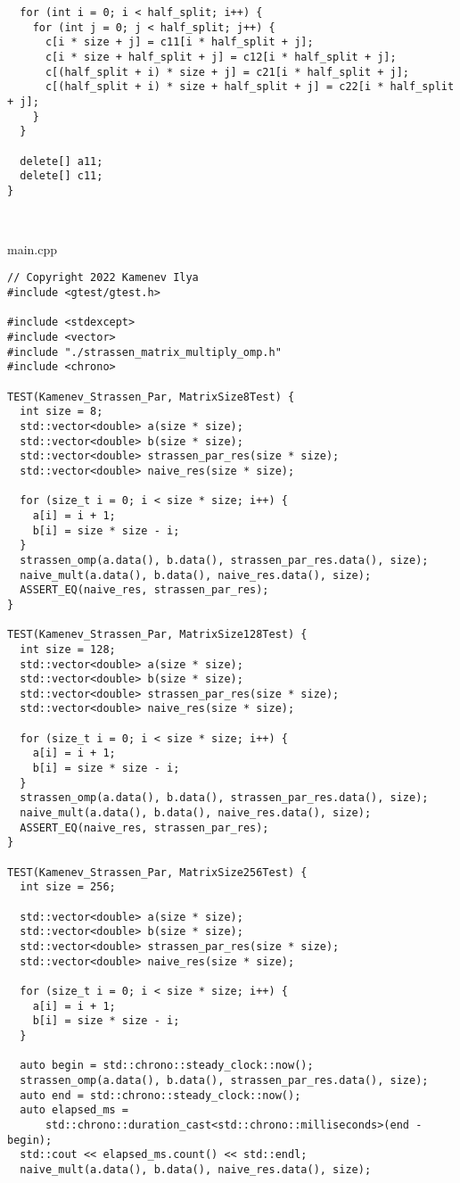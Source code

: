 \documentclass{report}
\begin{document}
\begin{lstlisting}
  for (int i = 0; i < half_split; i++) {
    for (int j = 0; j < half_split; j++) {
      c[i * size + j] = c11[i * half_split + j];
      c[i * size + half_split + j] = c12[i * half_split + j];
      c[(half_split + i) * size + j] = c21[i * half_split + j];
      c[(half_split + i) * size + half_split + j] = c22[i * half_split + j];
    }
  }

  delete[] a11;
  delete[] c11;
}



\end{lstlisting}
main.cpp
\begin{lstlisting}
// Copyright 2022 Kamenev Ilya
#include <gtest/gtest.h>

#include <stdexcept>
#include <vector>
#include "./strassen_matrix_multiply_omp.h"
#include <chrono>

TEST(Kamenev_Strassen_Par, MatrixSize8Test) {
  int size = 8;
  std::vector<double> a(size * size);
  std::vector<double> b(size * size);
  std::vector<double> strassen_par_res(size * size);
  std::vector<double> naive_res(size * size);

  for (size_t i = 0; i < size * size; i++) {
    a[i] = i + 1;
    b[i] = size * size - i;
  }
  strassen_omp(a.data(), b.data(), strassen_par_res.data(), size);
  naive_mult(a.data(), b.data(), naive_res.data(), size);
  ASSERT_EQ(naive_res, strassen_par_res);
}

TEST(Kamenev_Strassen_Par, MatrixSize128Test) {
  int size = 128;
  std::vector<double> a(size * size);
  std::vector<double> b(size * size);
  std::vector<double> strassen_par_res(size * size);
  std::vector<double> naive_res(size * size);

  for (size_t i = 0; i < size * size; i++) {
    a[i] = i + 1;
    b[i] = size * size - i;
  }
  strassen_omp(a.data(), b.data(), strassen_par_res.data(), size);
  naive_mult(a.data(), b.data(), naive_res.data(), size);
  ASSERT_EQ(naive_res, strassen_par_res);
}

TEST(Kamenev_Strassen_Par, MatrixSize256Test) {
  int size = 256;

  std::vector<double> a(size * size);
  std::vector<double> b(size * size);
  std::vector<double> strassen_par_res(size * size);
  std::vector<double> naive_res(size * size);

  for (size_t i = 0; i < size * size; i++) {
    a[i] = i + 1;
    b[i] = size * size - i;
  }

  auto begin = std::chrono::steady_clock::now();
  strassen_omp(a.data(), b.data(), strassen_par_res.data(), size);
  auto end = std::chrono::steady_clock::now();
  auto elapsed_ms =
      std::chrono::duration_cast<std::chrono::milliseconds>(end - begin);
  std::cout << elapsed_ms.count() << std::endl;
  naive_mult(a.data(), b.data(), naive_res.data(), size);


\end{lstlisting}
\end{document}

